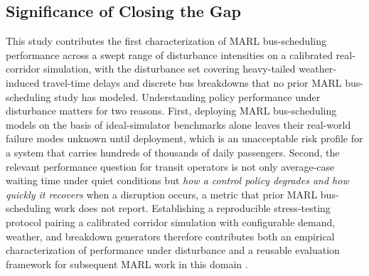 \subsection{Significance of Closing the Gap}
This study contributes the first characterization of MARL bus-scheduling performance across a swept range of disturbance intensities on a calibrated real-corridor simulation, with the disturbance set covering heavy-tailed weather-induced travel-time delays and discrete bus breakdowns that no prior MARL bus-scheduling study has modeled. Understanding policy performance under disturbance matters for two reasons. First, deploying MARL bus-scheduling models on the basis of ideal-simulator benchmarks alone leaves their real-world failure modes unknown until deployment, which is an unacceptable risk profile for a system that carries hundreds of thousands of daily passengers. Second, the relevant performance question for transit operators is not only average-case waiting time under quiet conditions but \textit{how a control policy degrades and how quickly it recovers} when a disruption occurs, a metric that prior MARL bus-scheduling work does not report. Establishing a reproducible stress-testing protocol pairing a calibrated corridor simulation with configurable demand, weather, and breakdown generators therefore contributes both an empirical characterization of performance under disturbance and a reusable evaluation framework for subsequent MARL work in this domain \cite{Li2023Departure,Wang2024MultiAGV,Che2024Recharging,Huang2025Joint,Bokade2023MARL}.